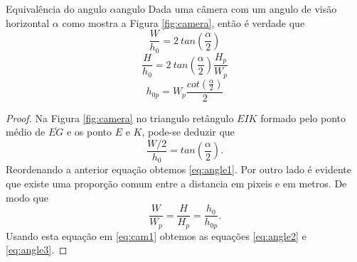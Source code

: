 \documentclass[a4paper,10pt]{article}
\begin{document}
\begin{theoremtcolorbox}{Equivalência do angulo $\alpha$}{angulo}
 Dada uma câmera com um angulo de visão horizontal $\alpha$ como mostra a Figura
 \ref{fig:camera}, então é verdade que
\begin{equation} \label{eq:angle1}
 \frac{W}{h_0} =2~tan(\frac{\alpha}{2})
\end{equation}
\begin{equation} \label{eq:angle2}
 \frac{H}{h_0} =2~tan(\frac{\alpha}{2}) \frac{H_p}{W_p}
\end{equation}
\begin{equation} \label{eq:angle3}
 h_{0p} =W_p \frac{cot(\frac{\alpha}{2})}{2}
\end{equation}
\end{theoremtcolorbox}
\begin{proof}
 Na Figura \ref{fig:camera} no triangulo retângulo $EIK$ formado
 pelo ponto médio de $\overline{EG}$ e os ponto $E$ e $K$, pode-se deduzir que
\begin{equation} \label{eq:cam1}
 \frac{W/2}{h_0}=tan(\frac{\alpha}{2}).
\end{equation}
Reordenando a anterior equação obtemos \eqref{eq:angle1}.
Por outro lado é evidente que existe uma proporção comum entre a distancia
em pixeis e em metros. De modo que
\begin{equation} \label{eq:cam3}
 \frac{W}{W_p}=\frac{H}{H_p}=\frac{h_0}{h_{0p}}.
\end{equation}
Usando esta equação em \eqref{eq:cam1} obtemos as equações \eqref{eq:angle2} e \eqref{eq:angle3}.
\end{proof}
\end{document}
